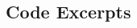 \documentclass[11pt,openright,a4paper]{report}
\begin{document}
\begin{landscape}
\begin{multicols}{2}
\chapter{Code Excerpts}

% 



 






\end{multicols}
\end{landscape}
\end{document}
